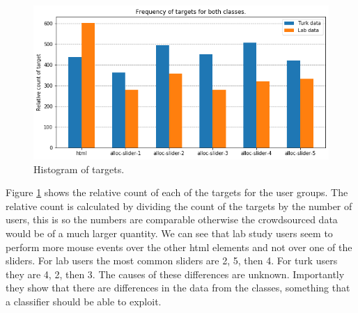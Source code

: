 \documentclass{article}
\begin{document}
\begin{figure}[ht]
    \centering
    \includegraphics[scale=0.6]{Images/1-grams.png}
    \caption{Histogram of targets.}
    \label{fig:1-grams}
\end{figure}

Figure \ref{fig:1-grams} shows the relative count of each of the targets for the user groups.
The relative count is calculated by dividing the count of the targets by the number of users, this is so the numbers are comparable otherwise the crowdsourced data would be of a much larger quantity.
We can see that lab study users seem to perform more mouse events over the other html elements and not over one of the sliders.
For lab users the most common sliders are 2, 5, then 4.
For turk users they are 4, 2, then 3.
The causes of these differences are unknown.
Importantly they show that there are differences in the data from the classes, something that a classifier should be able to exploit.


\end{document}
